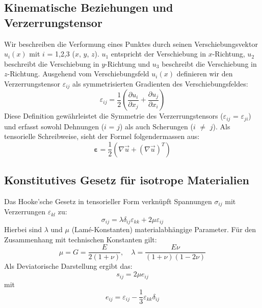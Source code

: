 \subsection{Kinematische Beziehungen und Verzerrungstensor}
Wir beschreiben die Verformung eines Punktes durch seinen Verschiebungsvektor $u_i(x)$ mit $i$ = 1,2,3 ($x$, $y$, $z$).
$u_1$ entspricht der Verschiebung in $x$-Richtung, $u_2$ beschreibt die Verschiebung in $y$-Richtung und $u_3$ beschreibt die Verschiebung in $z$-Richtung.
Ausgehend vom Verschiebungsfeld $u_i(x)$ definieren wir den Verzerrungstensor $\varepsilon_{ij}$ als symmetrisierten Gradienten des Verschiebungsfeldes:
	\begin{equation}
		\varepsilon_{ij} = 
		\frac{1}{2} \left( \frac{\partial u_i}{\partial x_j} + \frac{\partial u_j}{\partial x_i} \right)
	\end{equation}
Diese Definition gewährleistet die Symmetrie des Verzerrungstensors ($\varepsilon_{ij}$ = $\varepsilon_{ji}$) und erfasst sowohl Dehnungen ($i$ = $j$) als auch Scherungen ($i$ $\neq$ $j$).
Als tensorielle Schreibweise, sieht der Formel folgendermassen aus:
	\begin{equation}
		\boldsymbol{\varepsilon} = 
		\frac{1}{2} \left( \nabla \vec{u} + (\nabla \vec{u})^T \right)
	\end{equation}

\subsection{Konstitutives Gesetz für isotrope Materialien}
Das Hooke'sche Gesetz in tensorieller Form verknüpft Spannungen $\sigma_{ij}$ mit Verzerrungen $\varepsilon_{kl}$ zu:
	\begin{equation}
		\sigma_{ij} = 
	\lambda \delta_{ij} \varepsilon_{kk} + 2\mu \varepsilon_{ij}
	\end{equation}
Hierbei sind $\lambda$ und $\mu$ (Lamé-Konstanten) materialabhängige Parameter. Für den Zusammenhang mit technischen Konstanten gilt:
	\begin{equation}
		\mu = 
		G = 
		\frac{E}{2(1+\nu)}, \quad \lambda = 
		\frac{E \nu}{(1+\nu)(1-2\nu)}
	\end{equation}	
Als Deviatorische Darstellung ergibt das:
	\begin{equation}
		s_{ij} =
		2\mu e_{ij}
	\end{equation}
mit
	\begin{equation}
		e_{ij} = 
		\varepsilon_{ij} - \frac{1}{3} \varepsilon_{kk} \delta_{ij}
	\end{equation}

